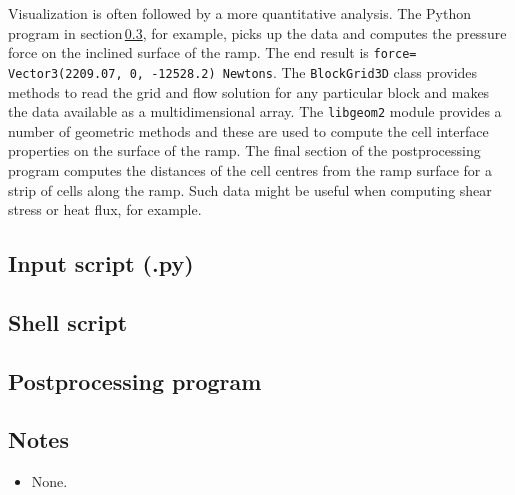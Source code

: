 \medskip
Visualization is often followed by a more quantitative analysis.  
The Python program in section\,\ref{simple-ramp-post-files}, for example,
picks up the data and computes the pressure force on the inclined surface of
the ramp.
The end result is \texttt{force= Vector3(2209.07, 0, -12528.2) Newtons}.
The \texttt{BlockGrid3D} class provides methods to read the grid and flow
solution for any particular block and makes the data available as a
multidimensional array.
The \texttt{libgeom2} module provides a number of geometric methods and these
are used to compute the cell interface properties on the surface of the ramp.
The final section of the postprocessing program computes the distances of the
cell centres from the ramp surface for a strip of cells along the ramp.
Such data might be useful when computing shear stress or heat flux, for example.


\subsection{Input script (.py)}
\topbar

\bottombar


\subsection{Shell script}
\label{simple-ramp-sh-files}
\topbar

\bottombar


\subsection{Postprocessing program}
\label{simple-ramp-post-files}
\topbar

\bottombar

\subsection{Notes}
\begin{itemize}
\item None.
\end{itemize}

